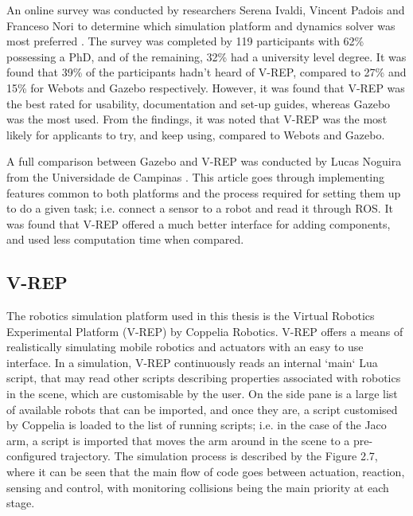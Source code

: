 \documentclass[12pt,openany,a4paper]{book}
\begin{document}
An online survey was conducted by researchers Serena Ivaldi, Vincent Padois and Franceso Nori to determine which simulation platform and dynamics solver was most preferred \cite{survey}. The survey was completed by 119 participants with 62\% possessing a PhD, and of the remaining, 32\% had a university level degree. It was found that 39\% of the participants hadn't heard of V-REP, compared to 27\% and 15\% for Webots and Gazebo respectively. However, it was found that V-REP was the best rated for usability, documentation and set-up guides, whereas Gazebo was the most used. From the findings, it was noted that V-REP was the most likely for applicants to try, and keep using, compared to Webots and Gazebo.

A full comparison between Gazebo and V-REP was conducted by Lucas Noguira from the Universidade de Campinas \cite{Nogueira2014ComparativeAB}. This article goes through implementing features common to both platforms and the process required for setting them up to do a given task; i.e. connect a sensor to a robot and read it through ROS. It was found that V-REP offered a much better interface for adding components, and used less computation time when compared. 

\subsection{V-REP}
The robotics simulation platform used in this thesis is the Virtual Robotics Experimental Platform (V-REP) by Coppelia Robotics. V-REP offers a means of realistically simulating mobile robotics and actuators with an easy to use interface. In a simulation, V-REP continuously reads an internal `main` Lua script, that may read other scripts describing properties associated with robotics in the scene, which are customisable by the user. On the side pane is a large list of available robots that can be imported, and once they are, a script customised by Coppelia is loaded to the list of running scripts; i.e. in the case of the Jaco arm, a script is imported that moves the arm around in the scene to a pre-configured trajectory. The simulation process is described by the Figure 2.7, where it can be seen that the main flow of code goes between actuation, reaction, sensing and control, with monitoring collisions being the main priority at each stage.
\end{document}
